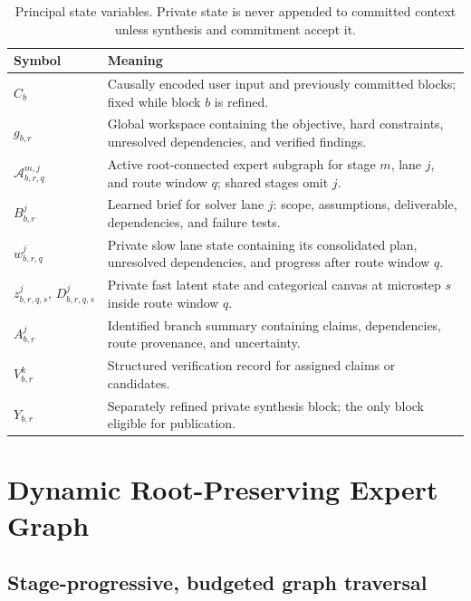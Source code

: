 \documentclass[10pt,a4paper]{article}
\newcommand{\Acal}{\mathcal{A}}
\begin{document}
\begin{table}[htbp]
\caption{Principal state variables. Private state is never appended to
committed context unless synthesis and commitment accept it.}
\label{tab:state}
\centering\small
\begin{tabularx}{\textwidth}{@{}lX@{}}
\toprule
\textbf{Symbol} & \textbf{Meaning} \\
\midrule
$C_b$ & Causally encoded user input and previously committed blocks; fixed while block $b$ is refined. \\
$g_{b,r}$ & Global workspace containing the objective, hard constraints, unresolved dependencies, and verified findings. \\
$\Acal^{m,j}_{b,r,q}$ & Active root-connected expert subgraph for stage $m$, lane $j$, and route window $q$; shared stages omit $j$. \\
$B^{j}_{b,r}$ & Learned brief for solver lane $j$: scope, assumptions, deliverable, dependencies, and failure tests. \\
$w^{j}_{b,r,q}$ & Private slow lane state containing its consolidated plan, unresolved dependencies, and progress after route window $q$. \\
$z^{j}_{b,r,q,s},\, D^{j}_{b,r,q,s}$ & Private fast latent state and categorical canvas at microstep $s$ inside route window $q$. \\
$A^{j}_{b,r}$ & Identified branch summary containing claims, dependencies, route provenance, and uncertainty. \\
$V^{k}_{b,r}$ & Structured verification record for assigned claims or candidates. \\
$Y_{b,r}$ & Separately refined private synthesis block; the only block eligible for publication. \\
\bottomrule
\end{tabularx}
\end{table}

\section{Dynamic Root-Preserving Expert Graph}
\label{sec:graph}

\subsection{Stage-progressive, budgeted graph traversal}
\end{document}
